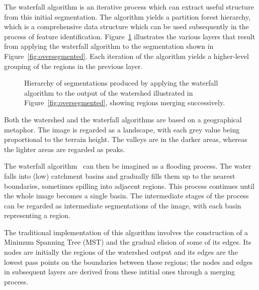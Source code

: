 \documentclass{ouclprgsc}
\begin{document}
The waterfall algorithm is an iterative process which can extract
useful structure from this initial segmentation. The algorithm yields
a partition forest hierarchy, which is a comprehensive data structure
which can be used subsequently in the process of feature
identification.  Figure~\ref{fig:waterfall} illustrates the various
layers that result from applying the waterfall algorithm to the
segmentation shown in Figure~\ref{fig:oversegmented}.  Each iteration
of the algorithm yields a higher-level grouping of the regions in the
previous layer.

\begin{figure}
\centering
\ifpdf
        \hspace{1mm}%
        \hspace{1mm}%
\else
\fi
\caption{Hierarchy of segmentations produced by applying the waterfall
  algorithm to the output of the watershed illustrated in
  Figure~\ref{fig:oversegmented}, showing regions merging
  successively.}
\label{fig:waterfall}
\end{figure}


Both the watershed and the waterfall algorithms are based on a
geographical metaphor. The image is regarded as a landscape, with each
grey value being proportional to the terrain height.
%
The valleys are
in the darker areas, whereas the lighter areas are regarded as peaks.

The waterfall algorithm~\cite{beucher94,marcotegui} can then be imagined
as a flooding process. The water falls into (low) catchment basins and
gradually fills them up to the nearest boundaries, sometimes spilling
into adjacent regions. This process continues until the whole image
becomes a single basin. The intermediate stages of the process can be
regarded as intermediate segmentations of the image, with each basin
representing a region.

The traditional implementation of this algorithm \cite{marcotegui}
involves the construction of a Minimum Spanning Tree (MST) and the
gradual elision of some of its edges.
Its nodes are initially the regions of the watershed output and its
edges are the lowest pass points on the boundaries between these
regions; the nodes and edges in subsequent layers are derived from
these intitial ones through a merging process.
\end{document}
